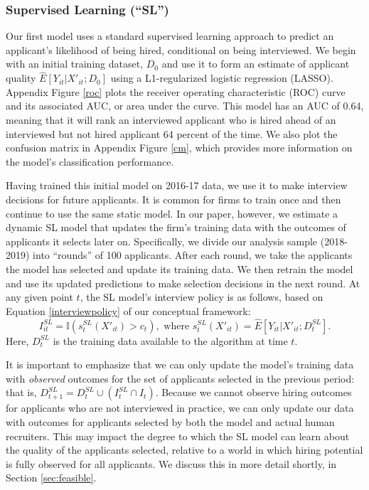 \documentclass[crop,noquery,editorname,historyrev,nosurname,runningno,sepcount]{RESTUD}
\begin{document}
	
\subsubsection{Supervised Learning (``SL'')} \label{sl_details}

Our first model uses a standard supervised learning approach to predict an applicant's likelihood of being hired, conditional on being interviewed.  We begin with an initial training dataset, $D_0$ and use it to form an estimate of applicant quality $\hat{E}[Y_{it} | X'_{it}; D_0]$ using a L1-regularized logistic regression (LASSO).  Appendix Figure \ref{roc} plots the receiver operating characteristic (ROC) curve and its associated AUC, or area under the curve.  This model has an AUC of 0.64, meaning that it will rank an interviewed applicant who is hired ahead of an interviewed but not hired applicant 64 percent of the time.  We also plot the confusion matrix in Appendix Figure \ref{cm}, which provides more information on the model's classification performance.

Having trained this initial model on 2016-17 data, we use it to make interview decisions for future applicants.  It is common for firms to train once and then continue to use the same static model.  In our paper, however, we estimate a dynamic SL model that updates the firm's training data with the outcomes of applicants it selects later on.  Specifically, we divide our analysis sample (2018-2019) into ``rounds'' of 100 applicants.  After each round, we take the applicants the model has selected and update its training data.  We then retrain the model and use its updated predictions to make selection decisions in the next round.  At any given point $t$, the SL model's interview policy is as follows, based on Equation \eqref{interviewpolicy} of our conceptual framework:
\begin{equation} \label{SLrule}
I_{it}^{SL}=\mathbb{I}(s_t^{SL}(X'_{it})>c_t), \text{ where } s_t^{SL}(X'_{it})=\hat{E}[Y_{it}|X'_{it}; D^{SL}_{t}].
\end{equation}
Here, $D^{SL}_{t}$ is the training data available to the algorithm at time $t$.  

It is important to emphasize that we can only update the model's training data with \textit{observed} outcomes for the set of applicants selected in the previous period: that is, $D^{SL}_{t+1} = D^{SL}_{t} \cup (I^{SL}_{t} \cap I_{t})$.  Because we cannot observe hiring outcomes for applicants who are not interviewed in practice, we can only update our data with outcomes for applicants selected by both the model and actual human recruiters.  This may impact the degree to which the SL model can learn about the quality of the applicants selected, relative to a world in which hiring potential is fully observed for all applicants. We discuss this in more detail shortly, in Section \ref{sec:feasible}. 
\end{document}
